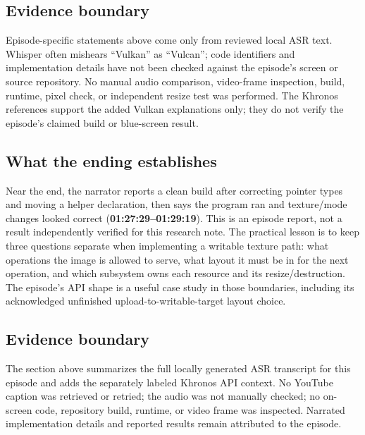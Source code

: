 \subsection{Evidence boundary}\label{05-engine-i-ch008-evidence-boundary}

\hypertarget{05-engine-i-ch008-evidence-boundary}{}

Episode-specific statements above come only from reviewed local ASR text. Whisper often mishears ``Vulkan'' as ``Vulcan''; code identifiers and implementation details have not been checked against the episode's screen or source repository. No manual audio comparison, video-frame inspection, build, runtime, pixel check, or independent resize test was performed. The Khronos references support the added Vulkan explanations only; they do not verify the episode's claimed build or blue-screen result.

\subsection{What the ending establishes}\label{05-engine-i-ch008-what-the-ending-establishes}

\hypertarget{05-engine-i-ch008-what-the-ending-establishes}{}

Near the end, the narrator reports a clean build after correcting pointer types and moving a helper declaration, then says the program ran and texture/mode changes looked correct (\textbf{01:27:29--01:29:19}). This is an episode report, not a result independently verified for this research note. The practical lesson is to keep three questions separate when implementing a writable texture path: what operations the image is allowed to serve, what layout it must be in for the next operation, and which subsystem owns each resource and its resize/destruction. The episode's API shape is a useful case study in those boundaries, including its acknowledged unfinished upload-to-writable-target layout choice.

\subsection{Evidence boundary}\label{05-engine-i-ch008-evidence-boundary-1}

\hypertarget{05-engine-i-ch008-evidence-boundary-1}{}

The section above summarizes the full locally generated ASR transcript for this episode and adds the separately labeled Khronos API context. No YouTube caption was retrieved or retried; the audio was not manually checked; no on-screen code, repository build, runtime, or video frame was inspected. Narrated implementation details and reported results remain attributed to the episode.


